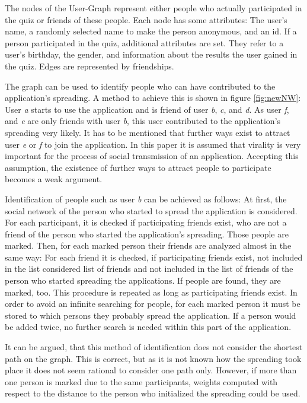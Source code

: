 \documentclass[preprint,12pt]{elsarticle}
\begin{document}
The nodes of the User-Graph represent either people who actually participated in the
quiz or friends of these people. Each node has some attributes: The
user's name, a randomly selected name to make the person anonymous,
and an id. If a person participated  
in the quiz, additional attributes are set. They refer to a
user's birthday, the gender, and information about the results the
user gained in the quiz. Edges are represented by friendships. 

The graph can be used to identify people who can have contributed to
the application's spreading. A method to achieve this is shown in
figure \ref{fig:newNW}: User \textit{a} starts to use
the application and is friend of user \textit{b}, \textit{c}, and
\textit{d}. As user \textit{f}, and \textit{e} are only friends with
user \textit{b}, this user contributed to the application's spreading
very likely. It has to be mentioned that further ways exist to attract user \textit{e} or \textit{f}
to join the application. In this paper it is assumed that virality
is very important for the process of social transmission of an
application. Accepting this assumption, the existence of further ways
to attract people to participate becomes a weak argument.

Identification of people such as user \textit{b} can be achieved as
follows: At first,
the social network of the person who started to spread the application is
considered. For each participant, it is checked if participating
friends exist, who are not a friend of the person who started the
application's spreading. Those people are marked. Then, for each
marked person their friends are analyzed almost in the same way: For
each friend it is checked, if participating friends exist, not
included in the list considered list of friends and not included in
the list of friends of the person who started spreading the
applications. If people are found, they are marked, too. This
procedure is repeated as long as participating friends exist. In order
to avoid an infinite searching for people, for each marked person it
must be stored to which persons they probably spread the
application. If a person would be added twice, no further search is
needed within this part of the application. 

It can be argued, that this method of identification does not consider
the shortest path on the graph. This is correct, but as it is not
known how the spreading took place it does not seem rational to
consider one path only. However, if more than one person is marked due to the
same participants, weights computed with respect to the distance
to the person who initialized the spreading could be used.
\end{document}
